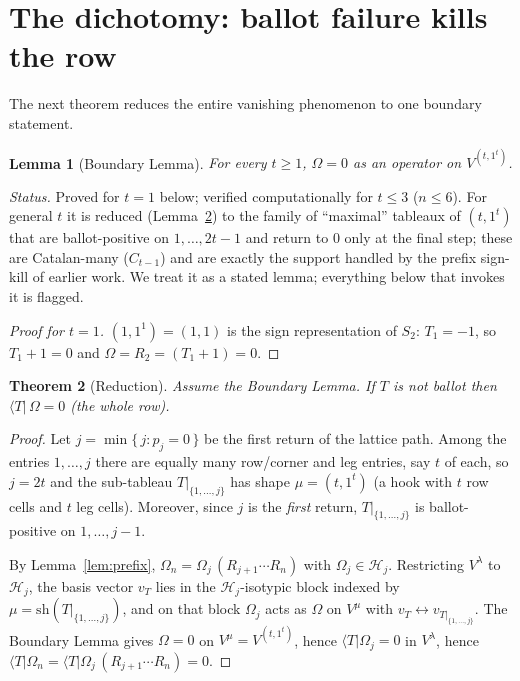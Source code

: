\documentclass[11pt]{article}
\newtheorem{theorem}{Theorem}
\newtheorem{lemma}[theorem]{Lemma}
\theoremstyle{definition}
\newcommand{\Om}{\Omega}
\newcommand{\HH}{\mathcal{H}}
\newcommand{\la}{\lambda}
\begin{document}
\section{The dichotomy: ballot failure kills the row}

The next theorem reduces the entire vanishing phenomenon to one boundary statement.

\begin{lemma}[Boundary Lemma]\label{lem:boundary}
For every $t\ge 1$, $\Om=0$ as an operator on $V^{(t,1^t)}$.
\end{lemma}

\noindent\emph{Status.} Proved for $t=1$ below; verified computationally for $t\le 3$
($n\le 6$). For general $t$ it is reduced (Lemma~\ref{lem:reduction}) to the family of
``maximal'' tableaux of $(t,1^t)$ that are ballot-positive on $1,\dots,2t-1$ and return to $0$
only at the final step; these are Catalan-many ($C_{t-1}$) and are exactly the support handled
by the prefix sign-kill of earlier work. We treat it as a stated lemma; everything below that
invokes it is flagged.

\begin{proof}[Proof for $t=1$]
$(1,1^1)=(1,1)$ is the sign representation of $S_2$: $T_1=-1$, so $T_1+1=0$ and
$\Om=R_2=(T_1+1)=0$.
\end{proof}

\begin{theorem}[Reduction]\label{lem:reduction}
Assume the Boundary Lemma. If $T$ is not ballot then $\langle T|\,\Om=0$ (the whole row).
\end{theorem}
\begin{proof}
Let $j=\min\{\,j:p_j=0\,\}$ be the first return of the lattice path. Among the entries
$1,\dots,j$ there are equally many row/corner and leg entries, say $t$ of each, so $j=2t$ and
the sub-tableau $T|_{\{1,\dots,j\}}$ has shape $\mu=(t,1^t)$ (a hook with $t$ row cells and $t$
leg cells). Moreover, since $j$ is the \emph{first} return, $T|_{\{1,\dots,j\}}$ is
ballot-positive on $1,\dots,j-1$.

By Lemma~\ref{lem:prefix}, $\Om_n=\Om_j\,(R_{j+1}\cdots R_n)$ with $\Om_j\in\HH_j$. Restricting
$V^\la$ to $\HH_j$, the basis vector $v_T$ lies in the $\HH_j$-isotypic block indexed by
$\mu=\mathrm{sh}(T|_{\{1,\dots,j\}})$, and on that block $\Om_j$ acts as $\Om$ on $V^\mu$ with
$v_T\leftrightarrow v_{T|_{\{1,\dots,j\}}}$. The Boundary Lemma gives $\Om=0$ on
$V^\mu=V^{(t,1^t)}$, hence $\langle T|\Om_j=0$ in $V^\la$, hence
$\langle T|\Om_n=\langle T|\Om_j\,(R_{j+1}\cdots R_n)=0$.
\end{proof}
\end{document}
